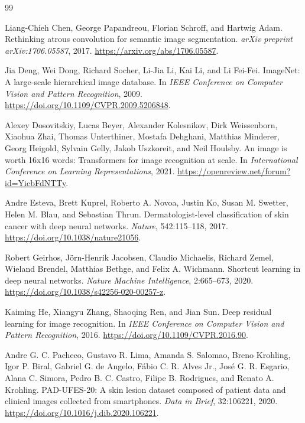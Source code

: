 \documentclass[10pt]{article}
\begin{document}
\begin{thebibliography}{99}

Liang-Chieh Chen, George Papandreou, Florian Schroff, and Hartwig Adam.
\newblock Rethinking atrous convolution for semantic image segmentation.
\newblock \emph{arXiv preprint arXiv:1706.05587}, 2017.
\newblock \url{https://arxiv.org/abs/1706.05587}.

Jia Deng, Wei Dong, Richard Socher, Li-Jia Li, Kai Li, and Li Fei-Fei.
\newblock ImageNet: A large-scale hierarchical image database.
\newblock In \emph{IEEE Conference on Computer Vision and Pattern Recognition}, 2009.
\newblock \url{https://doi.org/10.1109/CVPR.2009.5206848}.

Alexey Dosovitskiy, Lucas Beyer, Alexander Kolesnikov, Dirk Weissenborn, Xiaohua Zhai, Thomas Unterthiner, Mostafa Dehghani, Matthias Minderer, Georg Heigold, Sylvain Gelly, Jakob Uszkoreit, and Neil Houlsby.
\newblock An image is worth 16x16 words: Transformers for image recognition at scale.
\newblock In \emph{International Conference on Learning Representations}, 2021.
\newblock \url{https://openreview.net/forum?id=YicbFdNTTy}.

Andre Esteva, Brett Kuprel, Roberto A. Novoa, Justin Ko, Susan M. Swetter, Helen M. Blau, and Sebastian Thrun.
\newblock Dermatologist-level classification of skin cancer with deep neural networks.
\newblock \emph{Nature}, 542:115--118, 2017.
\newblock \url{https://doi.org/10.1038/nature21056}.

Robert Geirhos, J{\"o}rn-Henrik Jacobsen, Claudio Michaelis, Richard Zemel, Wieland Brendel, Matthias Bethge, and Felix A. Wichmann.
\newblock Shortcut learning in deep neural networks.
\newblock \emph{Nature Machine Intelligence}, 2:665--673, 2020.
\newblock \url{https://doi.org/10.1038/s42256-020-00257-z}.

Kaiming He, Xiangyu Zhang, Shaoqing Ren, and Jian Sun.
\newblock Deep residual learning for image recognition.
\newblock In \emph{IEEE Conference on Computer Vision and Pattern Recognition}, 2016.
\newblock \url{https://doi.org/10.1109/CVPR.2016.90}.

Andre G. C. Pacheco, Gustavo R. Lima, Amanda S. Salomao, Breno Krohling, Igor P. Biral, Gabriel G. de Angelo, F{\'a}bio C. R. Alves Jr., Jos{\'e} G. R. Esgario, Alana C. Simora, Pedro B. C. Castro, Filipe B. Rodrigues, and Renato A. Krohling.
\newblock PAD-UFES-20: A skin lesion dataset composed of patient data and clinical images collected from smartphones.
\newblock \emph{Data in Brief}, 32:106221, 2020.
\newblock \url{https://doi.org/10.1016/j.dib.2020.106221}.


\end{thebibliography}
\end{document}
